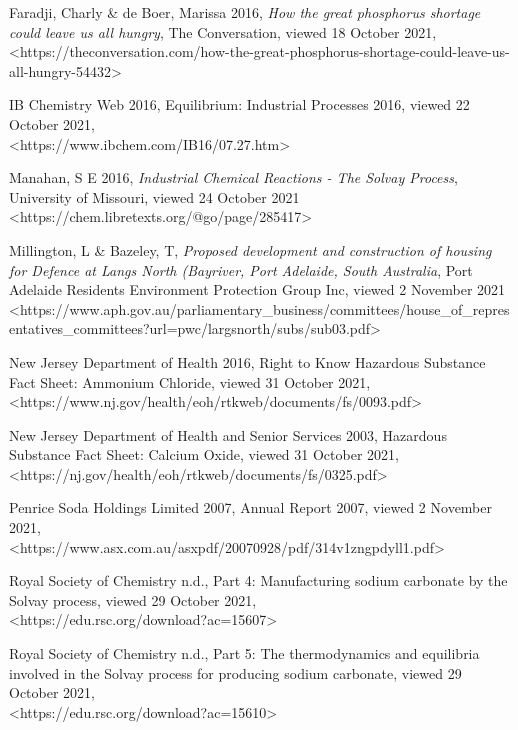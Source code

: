 \documentclass[12pt, a4paper]{article}
\begin{document}
Faradji, Charly \& de Boer, Marissa 2016, \emph{How the great phosphorus shortage could leave us all hungry}, The Conversation, viewed 18 October 2021, \\ \textless{https://theconversation.com/how-the-great-phosphorus-shortage-could-leave-us-all-hungry-54432}\textgreater

IB Chemistry Web 2016, Equilibrium: Industrial Processes 2016, viewed 22 October 2021, \\ \textless{https://www.ibchem.com/IB16/07.27.htm}\textgreater

Manahan, S E 2016, \emph{Industrial Chemical Reactions - The Solvay Process}, University of Missouri, viewed 24 October 2021 \\ \textless{https://chem.libretexts.org/@go/page/285417}\textgreater

Millington, L \& Bazeley, T, \emph{Proposed development and construction of housing for Defence at Langs North (Bayriver, Port Adelaide, South Australia}, Port Adelaide Residents Environment Protection Group Inc, viewed 2 November 2021 \\ \textless{https://www.aph.gov.au/parliamentary\_business/committees/house\_of\_representatives\_committees?url=pwc/largsnorth/subs/sub03.pdf}\textgreater

New Jersey Department of Health 2016, Right to Know Hazardous Substance Fact Sheet: Ammonium Chloride, viewed 31 October 2021, \\ \textless{https://www.nj.gov/health/eoh/rtkweb/documents/fs/0093.pdf}\textgreater

New Jersey Department of Health and Senior Services 2003, Hazardous Substance Fact Sheet: Calcium Oxide, viewed 31 October 2021, \\ \textless{https://nj.gov/health/eoh/rtkweb/documents/fs/0325.pdf}\textgreater

Penrice Soda Holdings Limited 2007, Annual Report 2007, viewed 2 November 2021, \\ \textless{https://www.asx.com.au/asxpdf/20070928/pdf/314v1zngpdyll1.pdf}\textgreater

Royal Society of Chemistry n.d., Part 4: Manufacturing sodium carbonate by the Solvay process, viewed 29 October 2021, \\ \textless{https://edu.rsc.org/download?ac=15607}\textgreater

Royal Society of Chemistry n.d., Part 5: The thermodynamics and equilibria involved in the Solvay process for producing sodium carbonate, viewed 29 October 2021, \\ \textless{https://edu.rsc.org/download?ac=15610}\textgreater
\end{document}
